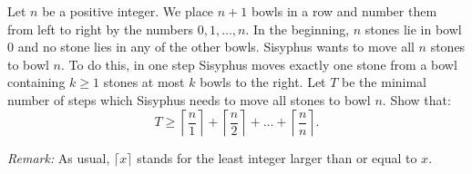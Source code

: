 Let $n$ be a positive integer.
We place $n+1$ bowls in a row and number them from left to right by the numbers $0,1,\ldots,n$.
In the beginning, $n$ stones lie in bowl $0$ and no stone lies in any of the other bowls.
Sisyphus wants to move all $n$ stones to bowl $n$.
To do this, in one step Sisyphus moves exactly one stone from a bowl containing $k\geq 1$ stones 
at most $k$ bowls to the right.
Let $T$ be the minimal number of steps which Sisyphus needs to move all stones to bowl $n$.
Show that:
$$T\geq \left\lceil \frac{n}{1} \right\rceil + \left\lceil \frac{n}{2} \right\rceil
+ \ldots + \left\lceil \frac{n}{n} \right\rceil.$$

\textit{Remark:} As usual, $\lceil x \rceil$ stands for the least integer larger than or equal to $x$.
